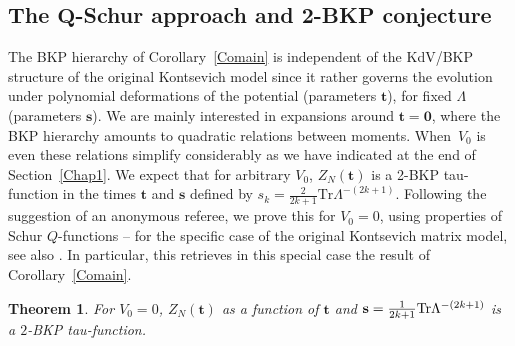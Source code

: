 \documentclass[10pt,a4paper]{amsart}
\numberwithin{equation}{section}
\newtheorem{Theorem}{Theorem}[section]
\begin{document}
\subsection[The Q-Schur approach and 2-BKP conjecture]{The $\boldsymbol{Q}$-Schur approach and $\boldsymbol{2}$-BKP conjecture}

The BKP hierarchy of Corollary~\ref{Comain} is independent of the KdV/BKP
structure of the original Kontsevich model
since it rather governs the evolution under polynomial deformations of
the potential (parameters $\mathbf{t}$), for fixed $\Lambda$ (parameters $\mathbf{s}$). We are
mainly interested in expansions around $\mathbf{t} =\boldsymbol{0}$, where the BKP hierarchy amounts to quadratic relations
 between moments. When~$V_0$ is even
these relations simplify considerably as we have indicated at the end of Section~\ref{Chap1}. We expect that for arbitrary $V_0$, $Z_N(\mathbf{t})$ is a 2-BKP tau-function in the times $\mathbf{t}$ and $\mathbf{s}$ defined by $s_k = \frac{2}{2k + 1} \mathrm{Tr} \Lambda^{-(2k + 1)}$. Following the suggestion of an anonymous referee, we prove this for ${V_0 = 0}$, using properties of Schur $Q$-functions -- for the specific case of the original Kontsevich matrix model, see also \cite{LY}. In particular, this retrieves in this special case the result of Corollary~\ref{Comain}.


\begin{Theorem}
\label{2BKP} For $V_0 = 0$, $Z_N(\mathbf{t})$ as a function of $\mathbf{t}$ and $\mathbf{s} = \frac{1}{2k + 1}{\rm Tr}\Lambda^{-(2k + 1)}$ is a $2$-BKP tau-function.
\end{Theorem}
\end{document}
